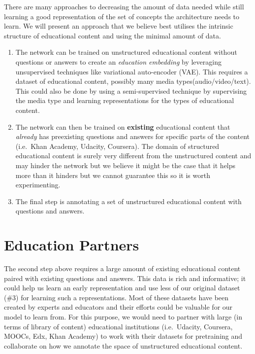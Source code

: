 \documentclass{acm_proc_article-sp}
\begin{document}
There are many approaches to decreasing the amount of data needed while
still learning a good representation of the set of concepts the
architecture needs to learn. We will present an approach that we believe
best utilises the intrinsic structure of educational content and using
the minimal amount of data.

\begin{enumerate}
\def\labelenumi{\arabic{enumi}.}
\item
  The network can be trained on unstructured educational content without
  questions or answers to create an \emph{education embedding} by
  leveraging unsupervised techniques like variational auto-encoder
  (VAE). This requires a dataset of educational content, possibly many
  media types(audio/video/text). This could also be done by using a
  semi-supervised technique by supervising the media type and learning
  representations for the types of educational content.
\item
  The network can then be trained on \textbf{existing} educational
  content that \emph{already} has preexisting questions and answers for
  specific parts of the content (i.e.~Khan Academy, Udacity, Coursera).
  The domain of structured educational content is surely very different
  from the unstructured content and may hinder the network but we
  believe it might be the case that it helps more than it hinders but we
  cannot guarantee this so it is worth experimenting.
\item
  The final step is annotating a set of unstructured educational content
  with questions and answers.
\end{enumerate}

\section{Education Partners}\label{education-partners}

The second step above requires a large amount of existing educational
content paired with existing questions and answers. This data is rich
and informative; it could help us learn an early representation and use
less of our original dataset (\#3) for learning such a representations.
Most of these datasets have been created by experts and educators and
their efforts could be valuable for our model to learn from. For this
purpose, we would need to partner with large (in terms of library of
content) educational institutions (i.e.~Udacity, Coursera, MOOCs, Edx,
Khan Academy) to work with their datasets for pretraining and
collaborate on how we annotate the space of unstructured educational
content.
\end{document}
